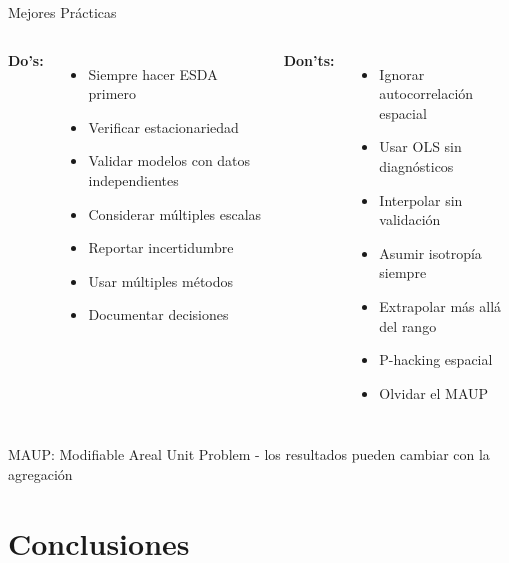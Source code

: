 \documentclass[10pt,aspectratio=169]{beamer}
\newcommand{\alertbox}[1]{
\begin{tcolorbox}[colframe=red!70,colback=red!5]
\centering\faExclamationTriangle\space #1
\end{tcolorbox}
}
\begin{document}
\begin{frame}{Mejores Prácticas}
    \begin{columns}[T]
        \textbf{\faCheckCircle\space Do's:}
        \begin{itemize}
            \item Siempre hacer ESDA primero
            \item Verificar estacionariedad
            \item Validar modelos con datos independientes
            \item Considerar múltiples escalas
            \item Reportar incertidumbre
            \item Usar múltiples métodos
            \item Documentar decisiones
        \end{itemize}
        
        \textbf{\faTimesCircle\space Don'ts:}
        \begin{itemize}
            \item Ignorar autocorrelación espacial
            \item Usar OLS sin diagnósticos
            \item Interpolar sin validación
            \item Asumir isotropía siempre
            \item Extrapolar más allá del rango
            \item P-hacking espacial
            \item Olvidar el MAUP
        \end{itemize}
    \end{columns}
    
    \vspace{0.5cm}
    \alertbox{MAUP: Modifiable Areal Unit Problem - los resultados pueden cambiar con la agregación}
\end{frame}

\section{Conclusiones}
\end{document}
